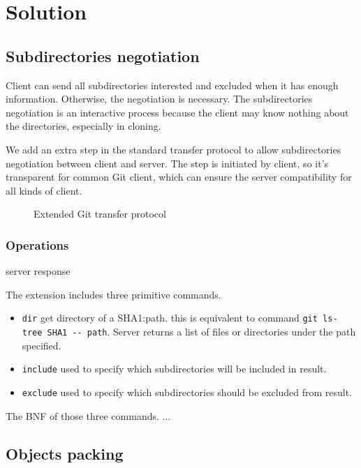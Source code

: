 \documentclass[preprint]{sigplanconf}
\begin{document}
\section{Solution}
\subsection{Subdirectories negotiation}
Client can send all subdirectories interested and excluded when it has enough information.
Otherwise, the negotiation is necessary.
The subdirectories negotiation is an interactive process because the client may know nothing about the directories, especially in cloning.

We add an extra step in the standard transfer protocol to allow subdirectories negotiation between client and server.
The step is initiated by client, so it's transparent for common Git client, which can ensure the server compatibility for all kinds of client.
\begin{figure}
  \centering
  
  \caption{Extended Git transfer protocol}
  \label{fig:git-proto-ext-seq}
\end{figure}
\subsubsection{Operations}
server response


The extension includes three primitive commands.
\begin{itemize}
  \item \verb|dir| get directory of a SHA1:path.
    this is equivalent to command \verb|git ls-tree SHA1 -- path|.
    Server returns a list of files or directories under the path specified.
  \item \verb|include| used to specify which subdirectories will be included in result.
  \item \verb|exclude| used to specify which subdirectories should be excluded from result.
\end{itemize}

The BNF of those three commands.
...

\subsection{Objects packing}
\end{document}
